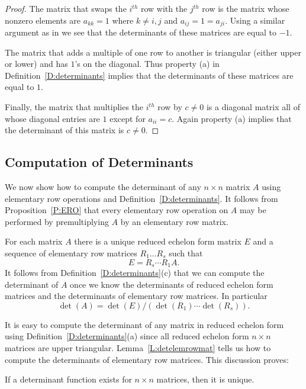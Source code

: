 \documentclass{ximera}
\begin{document}
\begin{proof} The matrix that swaps the $i^{th}$ row with the $j^{th}$
row is the matrix whose nonzero elements are $a_{kk}=1$ where
$k\neq i,j$ and $a_{ij}=1=a_{ji}$.  Using a similar argument as
in  we see that the determinants of these
matrices are equal to $-1$.
 
The matrix that adds a multiple of one row to another is
triangular (either upper or lower) and has $1$'s on the
diagonal.  Thus property (a) in Definition~\ref{D:determinants}
implies that the determinants of
these matrices are equal to $1$.
 
Finally, the matrix that multiplies the $i^{th}$ row by $c\neq
0$ is a diagonal matrix all of whose diagonal entries are $1$
except for $a_{ii}=c$.  Again property (a) implies that the
determinant of this matrix is $c\neq 0$. \end{proof}


\subsection*{Computation of Determinants}

We now show how to compute the determinant of any $n\times n$ matrix $A$ 
using elementary row operations and Definition~\ref{D:determinants}.  It 
follows from Proposition~\ref{P:ERO} that every elementary row operation 
on $A$ may be performed by premultiplying $A$ by an elementary row matrix. 

For each matrix $A$ there is a unique 
reduced echelon form matrix
$E$ and a sequence of elementary row matrices $R_1\ldots R_s$
such that 
\begin{equation}  \label{e:rowreduction}
E = R_s\cdots R_1A.
\end{equation}
It follows from Definition~\ref{D:determinants}(c) that we can
compute the determinant of $A$ once we know the determinants of
reduced echelon form matrices and the determinants of elementary
row matrices.  In particular
\begin{equation}  \label{e:detformula}
\det(A) = \det(E)/(\det(R_1)\cdots\det(R_s)).
\end{equation}

It is easy to compute the determinant of any matrix in reduced echelon 
form using Definition~\ref{D:determinants}(a) since all reduced echelon 
form $n\times n$ matrices are upper triangular.  Lemma~\ref{L:detelemrowmat}  
tells us how to compute the determinants of elementary row matrices.  This 
discussion proves: 
\begin{proposition}
If a determinant function exists for $n\times n$ matrices, then it is unique. 
\end{proposition}
\end{document}
